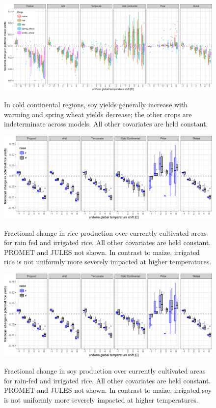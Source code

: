 \documentclass[10pt]{article}
\begin{document}
{\begin{figure}[h!]
\includegraphics[width=\textwidth]{s_sim_KG_crops_all.png}\\
\caption{In cold continental regions, soy yields generally increase with warming and spring wheat yields decrease; the other crops are indeterminate across models. All other covariates are held constant.}
\label{fig:KGcrops_all}
\end{figure}

\begin{figure}[h!]
\includegraphics[width=\textwidth]{s_rice_sim_CG_area_weight.png}\\
\caption{Fractional change in rice production over currently cultivated areas for rain fed and irrigated rice. All other covariates are held constant. PROMET and JULES not shown. In contrast to maize, irrigated rice is not uniformly more severely impacted at higher temperatures.}
\label{fig:rice_currentcult}
\end{figure}

\begin{figure}[h!]
\includegraphics[width=\textwidth]{s_rice_sim_CG_area_weight.png}\\
\caption{Fractional change in soy production over currently cultivated areas for rain-fed and irrigated rice. All other covariates are held constant. PROMET and JULES not shown. In contrast to maize, irrigated soy is not uniformly more severely impacted at higher temperatures.}
\label{fig:soy_currentcult}
\end{figure}

}
\end{document}
